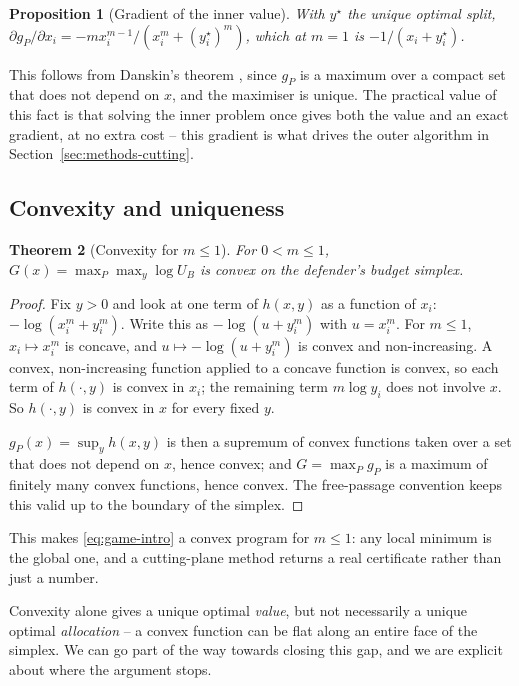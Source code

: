\documentclass[11pt,a4paper]{article}
\theoremstyle{plain}
\newtheorem{theorem}{Theorem}[section]
\newtheorem{proposition}[theorem]{Proposition}
\theoremstyle{definition}
\begin{document}
\begin{proposition}[Gradient of the inner value]
\label{prop:danskin}
With $y^{\star}$ the unique optimal split,
$\partial g_P/\partial x_i=-mx_i^{m-1}/(x_i^m+(y_i^{\star})^m)$, which at
$m=1$ is $-1/(x_i+y_i^{\star})$.
\end{proposition}
This follows from Danskin's theorem \citep{danskin1967}, since $g_P$ is a
maximum over a compact set that does not depend on $x$, and the
maximiser is unique. The practical value of this fact is that solving the
inner problem once gives both the value and an exact gradient, at no
extra cost -- this gradient is what drives the outer algorithm in
Section~\ref{sec:methods-cutting}.

\subsection{Convexity and uniqueness}
\label{sec:methods-convexity}

\begin{theorem}[Convexity for $m\le1$]
\label{thm:convexity}
For $0<m\le1$, $G(x)=\max_P\max_y\log U_B$ is convex on the defender's
budget simplex.
\end{theorem}
\begin{proof}
Fix $y>0$ and look at one term of $h(x,y)$ as a function of $x_i$:
$-\log(x_i^m+y_i^m)$. Write this as $-\log(u+y_i^m)$ with $u=x_i^m$. For
$m\le1$, $x_i\mapsto x_i^m$ is concave, and $u\mapsto-\log(u+y_i^m)$ is
convex and non-increasing. A convex, non-increasing function applied to a
concave function is convex, so each term of $h(\cdot,y)$ is convex in
$x_i$; the remaining term $m\log y_i$ does not involve $x$. So
$h(\cdot,y)$ is convex in $x$ for every fixed $y$.

$g_P(x)=\sup_y h(x,y)$ is then a supremum of convex functions taken over a
set that does not depend on $x$, hence convex; and $G=\max_P g_P$ is a
maximum of finitely many convex functions, hence convex. The free-passage
convention keeps this valid up to the boundary of the simplex.
\end{proof}

This makes \eqref{eq:game-intro} a convex program for $m\le1$: any local
minimum is the global one, and a cutting-plane method returns a real
certificate rather than just a number.

Convexity alone gives a unique optimal \emph{value}, but not necessarily a
unique optimal \emph{allocation} -- a convex function can be flat along an
entire face of the simplex. We can go part of the way towards closing this
gap, and we are explicit about where the argument stops.
\end{document}

